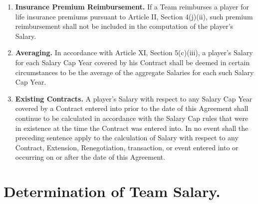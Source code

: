 \documentclass[
]{book}
\begin{document}
\begin{enumerate}
\item
  \textbf{Insurance Premium Reimbursement.} If a Team reimburses a player for life insurance premiums pursuant to Article II, Section 4(j)(ii), such premium reimbursement shall not be included in the computation of the player's Salary.
\item
  \textbf{Averaging.} In accordance with Article XI, Section 5(c)(iii), a player's Salary for each Salary Cap Year covered by his Contract shall be deemed in certain circumstances to be the average of the aggregate Salaries for each such Salary Cap Year.
\item
  \textbf{Existing Contracts.} A player's Salary with respect to any Salary Cap Year covered by a Contract entered into prior to the date of this Agreement shall continue to be calculated in accordance with the Salary Cap rules that were in existence at the time the Contract was entered into. In no event shall the preceding sentence apply to the calculation of Salary with respect to any Contract, Extension, Renegotiation, transaction, or event entered into or occurring on or after the date of this Agreement.
\end{enumerate}

\hypertarget{determination-of-team-salary.}{%
\section{Determination of Team Salary.}\label{determination-of-team-salary.}}
\end{document}
